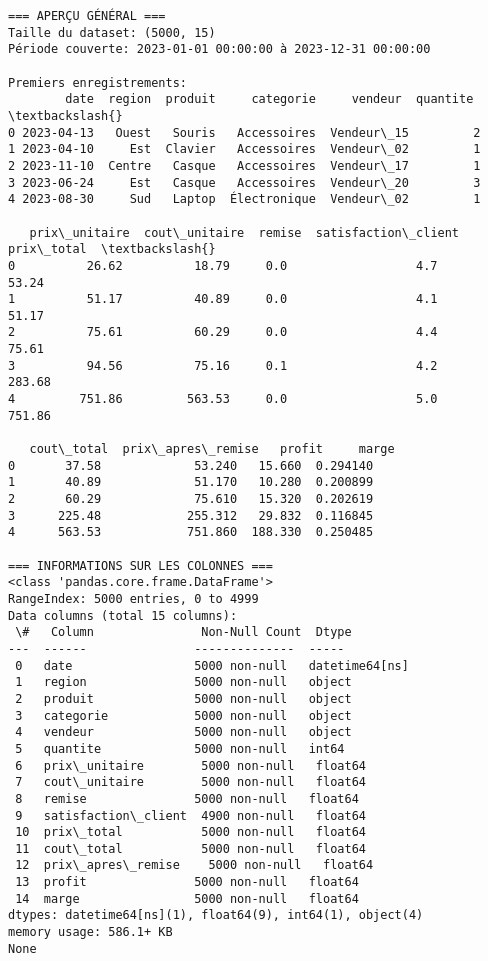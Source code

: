 \documentclass[11pt]{article}
\begin{document}
    \begin{Verbatim}[commandchars=\\\{\}]
=== APERÇU GÉNÉRAL ===
Taille du dataset: (5000, 15)
Période couverte: 2023-01-01 00:00:00 à 2023-12-31 00:00:00

Premiers enregistrements:
        date  region  produit     categorie     vendeur  quantite  \textbackslash{}
0 2023-04-13   Ouest   Souris   Accessoires  Vendeur\_15         2
1 2023-04-10     Est  Clavier   Accessoires  Vendeur\_02         1
2 2023-11-10  Centre   Casque   Accessoires  Vendeur\_17         1
3 2023-06-24     Est   Casque   Accessoires  Vendeur\_20         3
4 2023-08-30     Sud   Laptop  Électronique  Vendeur\_02         1

   prix\_unitaire  cout\_unitaire  remise  satisfaction\_client  prix\_total  \textbackslash{}
0          26.62          18.79     0.0                  4.7       53.24
1          51.17          40.89     0.0                  4.1       51.17
2          75.61          60.29     0.0                  4.4       75.61
3          94.56          75.16     0.1                  4.2      283.68
4         751.86         563.53     0.0                  5.0      751.86

   cout\_total  prix\_apres\_remise   profit     marge
0       37.58             53.240   15.660  0.294140
1       40.89             51.170   10.280  0.200899
2       60.29             75.610   15.320  0.202619
3      225.48            255.312   29.832  0.116845
4      563.53            751.860  188.330  0.250485

=== INFORMATIONS SUR LES COLONNES ===
<class 'pandas.core.frame.DataFrame'>
RangeIndex: 5000 entries, 0 to 4999
Data columns (total 15 columns):
 \#   Column               Non-Null Count  Dtype
---  ------               --------------  -----
 0   date                 5000 non-null   datetime64[ns]
 1   region               5000 non-null   object
 2   produit              5000 non-null   object
 3   categorie            5000 non-null   object
 4   vendeur              5000 non-null   object
 5   quantite             5000 non-null   int64
 6   prix\_unitaire        5000 non-null   float64
 7   cout\_unitaire        5000 non-null   float64
 8   remise               5000 non-null   float64
 9   satisfaction\_client  4900 non-null   float64
 10  prix\_total           5000 non-null   float64
 11  cout\_total           5000 non-null   float64
 12  prix\_apres\_remise    5000 non-null   float64
 13  profit               5000 non-null   float64
 14  marge                5000 non-null   float64
dtypes: datetime64[ns](1), float64(9), int64(1), object(4)
memory usage: 586.1+ KB
None


\end{Verbatim}
\end{document}
